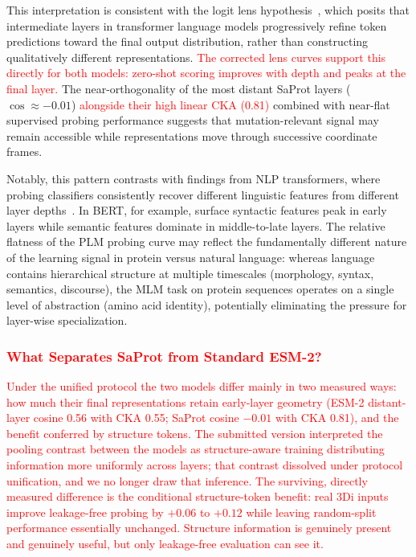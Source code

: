 \documentclass[11pt,a4paper]{article}
\newcommand{\revised}[1]{\textcolor{red}{#1}}
\begin{document}
This interpretation is consistent with the logit lens
hypothesis~\cite{nostalgebraist2020,belrose2023eliciting},
which posits that intermediate layers in transformer language models progressively
refine token predictions toward the final output distribution, rather than
constructing qualitatively different representations. \revised{The corrected lens
curves support this directly for both models: zero-shot scoring improves with depth
and peaks at the final layer.} The near-orthogonality of the most distant SaProt
layers ($\cos \approx -0.01$) \revised{alongside their high linear CKA (0.81)}
combined with near-flat supervised probing
performance suggests that mutation-relevant signal may remain accessible while
representations move through successive coordinate frames.

Notably, this pattern contrasts with findings from NLP transformers, where
probing classifiers consistently recover different linguistic features from
different layer depths~\cite{tenney2019bert,rogers2021bertology}. In BERT, for example,
surface syntactic features peak in early layers while semantic features dominate
in middle-to-late layers. The relative flatness of the PLM probing curve may
reflect the fundamentally different nature of the learning signal in protein
versus natural language: whereas language contains hierarchical structure at
multiple timescales (morphology, syntax, semantics, discourse), the MLM task on
protein sequences operates on a single level of abstraction (amino acid identity),
potentially eliminating the pressure for layer-wise specialization.

\subsubsection{\revised{What Separates SaProt from Standard ESM-2?}}

\revised{Under the unified protocol the two models differ mainly in two measured
ways: how much their final representations retain early-layer geometry (ESM-2
distant-layer cosine 0.56 with CKA 0.55; SaProt cosine $-0.01$ with CKA 0.81), and
the benefit conferred by structure tokens. The submitted version interpreted the
pooling contrast between the models as structure-aware training distributing
information more uniformly across layers; that contrast dissolved under protocol
unification, and we no longer draw that inference. The surviving, directly measured
difference is the conditional structure-token benefit: real 3Di inputs improve
leakage-free probing by $+0.06$ to $+0.12$ while leaving random-split performance
essentially unchanged. Structure information is genuinely present and genuinely
useful, but only leakage-free evaluation can see it.}
\end{document}
